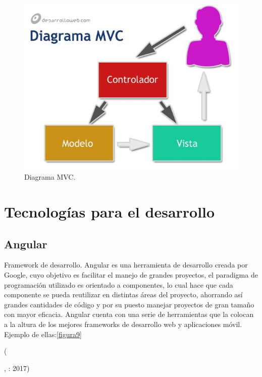 \begin{figure}[h]
  \label{figura8}
  \centering
  \includegraphics[scale=.35]{lib/assets/8}
  \caption{Diagrama MVC.}
\end{figure}

\section{Tecnologías para el desarrollo}
\subsection{Angular}

\begin{center}
  \begin{minipage}{0.9\linewidth}
    \vspace{5pt}%
    {\small
    Framework de desarrollo.
    Angular es una herramienta de desarrollo creada por Google, cuyo objetivo es facilitar el manejo de grandes proyectos, el paradigma de programación utilizado es orientado a componentes, lo cual hace que cada componente se pueda reutilizar en distintas áreas del proyecto, ahorrando así grandes cantidades de código y por su puesto manejar proyectos de gran tamaño con mayor eficacia. Angular cuenta con una serie de herramientas que la colocan a la altura de los mejores frameworks de desarrollo web y aplicaciones móvil.  Ejemplo de ellas:\ref{figura9}
    }
    \begin{flushright}
      (\author{Mozilla Developer Network.},
      : 2017)
    \end{flushright}
      \vspace{5pt}%
  \end{minipage}
\end{center}



